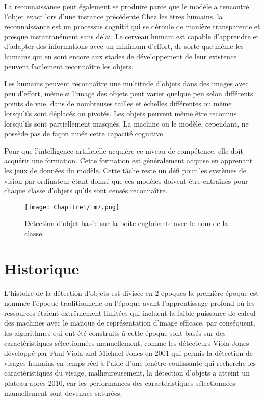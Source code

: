      La reconnaissance peut également se produire parce que le modèle a rencontré l'objet exact lors d'une instance précédente Chez les êtres humains, la reconnaissance est un processus cognitif qui se déroule de manière transparente et presque instantanément sans délai. Le cerveau humain est capable d'apprendre et d'adapter des informations avec un minimum d'effort, de sorte que même les humains qui en sont encore aux stades de développement de leur existence peuvent facilement reconnaître les objets.

     Les humains peuvent reconnaître une multitude d'objets dans des images avec peu d'effort, même si l'image des objets peut varier quelque peu selon différents points de vue, dans de nombreuses tailles et échelles différentes ou même lorsqu'ils sont déplacés ou pivotés. Les objets peuvent même être reconnus lorsqu'ils sont partiellement masqués. La machine ou le modèle, cependant, ne possède pas de façon innée cette capacité cognitive.

     Pour que l'intelligence artificielle acquière ce niveau de compétence, elle doit acquérir une formation. Cette formation est généralement acquise en apprenant les jeux de données du modèle. Cette tâche reste un défi pour les systèmes de vision par ordinateur étant donné que ces modèles doivent être entraînés pour chaque classe d'objets qu'ils sont censés reconnaître.

     \begin{figure}[H]
          \centering
          \texttt{[image: Chapitre1/im7.png]}
          \caption{Détection d'objet basée sur la boîte englobante avec le nom de la classe.}
          \label{im7}
          \end{figure}

\section{Historique}
L'histoire de la détection d'objets est divisée en 2 époques la première époque est nommée l'époque traditionnelle ou l'époque avant l'apprentissage profond où les ressources étaient extrêmement limitées qui incluent la faible puissance de calcul des machines avec le manque de représentation d'image efficace, par conséquent, les algorithmes qui ont été construits à cette époque sont basés sur des caractéristiques sélectionnées manuellement, comme les détecteurs Viola Jones développé par Paul Viola and Michael Jones en 2001
qui permis la détection de visages humains en temps réel à l'aide d'une fenêtre coulissante qui recherche les caractéristiques du visage, malheureusement, la détection d'objets a atteint un plateau après 2010, car les performances des caractéristiques sélectionnées manuellement sont devenues saturées.

